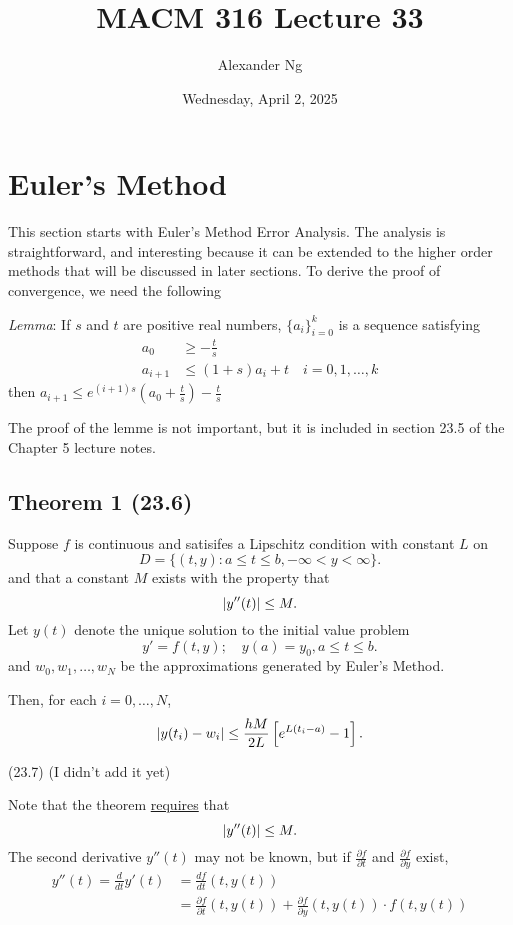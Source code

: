 \documentclass[12pt]{article}
\newcommand{\lemma}{\textit{Lemma}\xspace}
\begin{document}
\title{MACM 316 Lecture 33}
\author{Alexander Ng}
\date{Wednesday, April 2, 2025}

\maketitle

\section{Euler's Method}
This section starts with Euler's Method Error Analysis. The analysis is
straightforward, and interesting because it can be extended to the higher order
methods that will be discussed in later sections. To derive the proof of
convergence, we need the following

\lemma: If $s$ and $t$ are positive real numbers, $\{a_i\}_{i=0}^k$ is a
sequence satisfying
\begin{align*}
  a_0 &\geq -\frac{t}{s} \\
  a_{i+1} &\leq (1+s) a_i + t \quad i = 0, 1, \ldots, k
\end{align*}
then $\displaystyle a_{i+1}\leq e^{(i+1)s}\left(a_0 + \frac{t}{s}\right) - \frac{t}{s}$

The proof of the lemme is not important, but it is included in section 23.5 of
the Chapter 5 lecture notes.

\subsection{Theorem 1 (23.6)}
Suppose $f$ is continuous and satisifes a Lipschitz condition with constant $L$
on
\[
D = \{(t,y) : a \leq t \leq b, -\infty < y < \infty \}
.\]
and that a constant $M$ exists with the property that
\[
  \abs{y''(t)} \leq M
.\]
Let $y(t)$ denote the unique solution to the initial value problem
\[
  y' = f(t,y); \quad y(a) = y_0, a \leq t \leq b
.\]
and $w_0, w_1, \dots, w_N$ be the approximations generated by Euler's Method.

Then, for each $i=0, \dots, N$, 
\[
  \abs{y(t_i) - w_i} \leq \frac{hM}{2L}\left[e^{L(t_i-a)}-1\right]
.\]

\proof (23.7) (I didn't add it yet)

Note that the theorem \uline{requires} that  
\[
  \abs{y''(t)} \leq M
.\]
The second derivative $y''(t)$ may not be known, but if $\frac{\partial
f}{\partial t}$ and $\frac{\partial f}{\partial y}$ exist,
\begin{align*}
  y''(t) = \frac{d}{dt} y'(t) &= \frac{df}{dt}(t,y(t)) \\
                              &= \frac{\partial f}{\partial
  t}(t,y(t)) + \frac{\partial f}{\partial y}(t,y(t)) \cdot f(t,y(t))
\end{align*}
\end{document}
